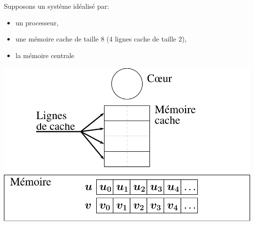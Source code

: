 \documentclass{beamer}
\begin{document}
\begin{frame}
	Supposons un système idéalisé par: 
	\begin{itemize}
		\item un processeur, 
		\item une mémoire cache de taille 8 (4 lignes cache de taille 2),
		\item la mémoire centrale
	\end{itemize}
	\begin{center}
	\includegraphics[scale=0.5]{../../Images/sequentiel}
   \end{center}
\end{frame}
\end{document}
